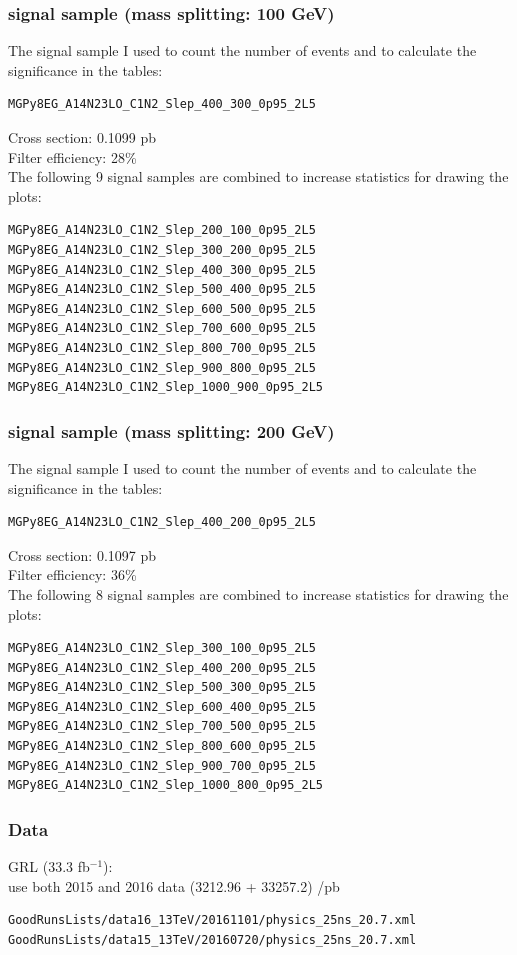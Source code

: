 \documentclass[mathserif,serif]{beamer}
\begin{document}
\begin{frame}[fragile]
\frametitle{signal sample (mass splitting: 100 GeV)}
\small
The signal sample I used to count the number of events and to calculate the significance in the tables:
\tiny
\begin{verbatim}
MGPy8EG_A14N23LO_C1N2_Slep_400_300_0p95_2L5
\end{verbatim}
\small
Cross section: 0.1099 pb \\
Filter efficiency: 28\% \\
\vspace{5mm}
The following 9 signal samples are combined to increase statistics for drawing the plots:
\tiny
\begin{verbatim}
MGPy8EG_A14N23LO_C1N2_Slep_200_100_0p95_2L5
MGPy8EG_A14N23LO_C1N2_Slep_300_200_0p95_2L5
MGPy8EG_A14N23LO_C1N2_Slep_400_300_0p95_2L5
MGPy8EG_A14N23LO_C1N2_Slep_500_400_0p95_2L5
MGPy8EG_A14N23LO_C1N2_Slep_600_500_0p95_2L5
MGPy8EG_A14N23LO_C1N2_Slep_700_600_0p95_2L5
MGPy8EG_A14N23LO_C1N2_Slep_800_700_0p95_2L5
MGPy8EG_A14N23LO_C1N2_Slep_900_800_0p95_2L5
MGPy8EG_A14N23LO_C1N2_Slep_1000_900_0p95_2L5
\end{verbatim}
\end{frame}

\begin{frame}[fragile]
\frametitle{signal sample (mass splitting: 200 GeV)}
\small
The signal sample I used to count the number of events and to calculate the significance in the tables:
\tiny
\begin{verbatim}
MGPy8EG_A14N23LO_C1N2_Slep_400_200_0p95_2L5
\end{verbatim}
\small
Cross section: 0.1097 pb \\
Filter efficiency: 36\% \\
\vspace{5mm}
The following 8 signal samples are combined to increase statistics for drawing the plots:
\tiny
\begin{verbatim}
MGPy8EG_A14N23LO_C1N2_Slep_300_100_0p95_2L5
MGPy8EG_A14N23LO_C1N2_Slep_400_200_0p95_2L5
MGPy8EG_A14N23LO_C1N2_Slep_500_300_0p95_2L5
MGPy8EG_A14N23LO_C1N2_Slep_600_400_0p95_2L5
MGPy8EG_A14N23LO_C1N2_Slep_700_500_0p95_2L5
MGPy8EG_A14N23LO_C1N2_Slep_800_600_0p95_2L5
MGPy8EG_A14N23LO_C1N2_Slep_900_700_0p95_2L5
MGPy8EG_A14N23LO_C1N2_Slep_1000_800_0p95_2L5
\end{verbatim}
\end{frame}

\begin{frame}[fragile]
\frametitle{Data}
\small
GRL (33.3 fb$^{-1}$):\\
use both 2015 and 2016 data (3212.96 + 33257.2) /pb
\tiny
\begin{verbatim}
GoodRunsLists/data16_13TeV/20161101/physics_25ns_20.7.xml
GoodRunsLists/data15_13TeV/20160720/physics_25ns_20.7.xml
\end{verbatim}
\end{frame}
\end{document}
